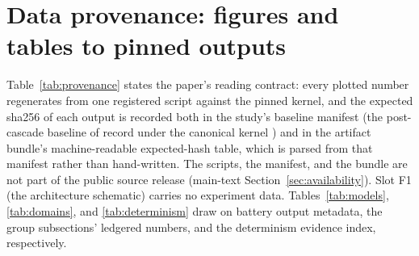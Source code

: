 \section{Data provenance: figures and tables to pinned outputs}
\label{sec:appendix-provenance}

Table~\ref{tab:provenance} states the paper's reading contract: every
plotted number regenerates from one registered script against the pinned
kernel, and the expected sha256 of each output is recorded both in the
study's baseline manifest (the post-cascade baseline of record under the
canonical kernel ) and in the artifact bundle's
machine-readable expected-hash table, which is parsed from that manifest
rather than hand-written. The scripts, the manifest, and the bundle are
not part of the public source release (main-text
Section~\ref{sec:availability}). Slot F1 (the architecture schematic)
carries no experiment data. Tables~\ref{tab:models}, \ref{tab:domains}, and
\ref{tab:determinism} draw on battery output metadata, the group
subsections' ledgered numbers, and the determinism evidence index,
respectively.

